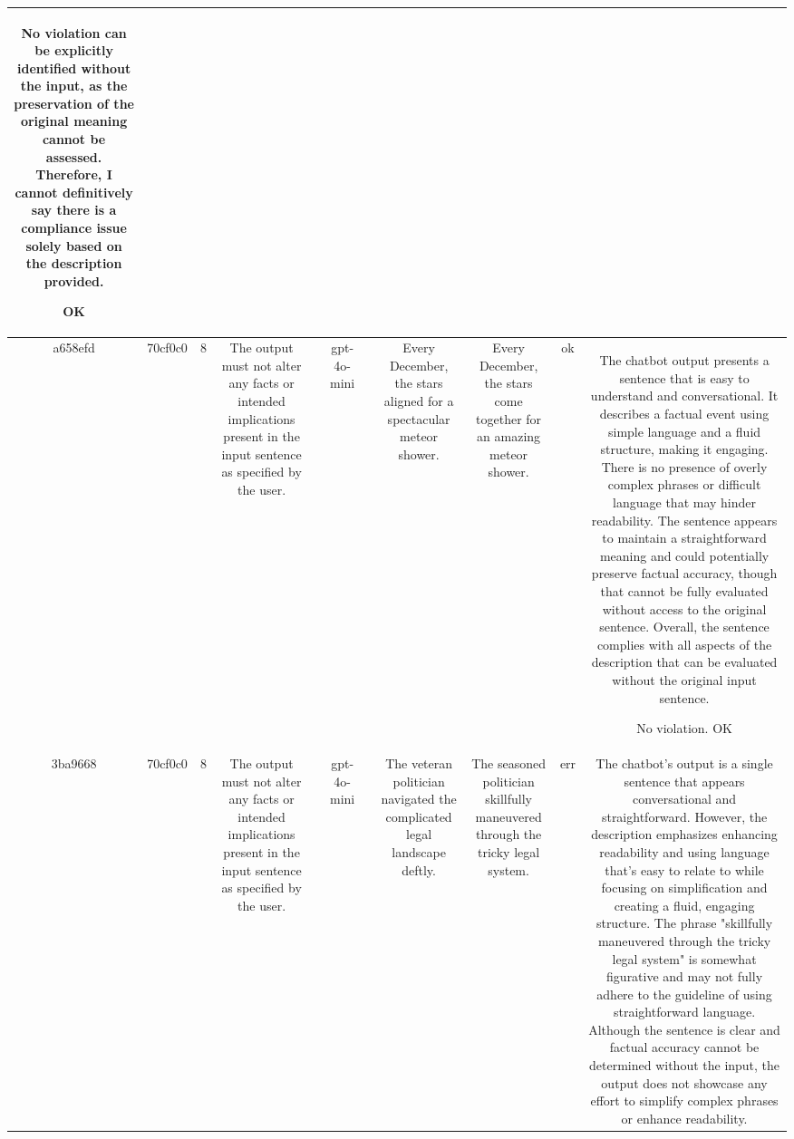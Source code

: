 \begin{table}[h!]
\begin{tabular}{|c|c|c|c|c|c|c|c|c|c|c|}
No violation can be explicitly identified without the input, as the preservation of the original meaning cannot be assessed. Therefore, I cannot definitively say there is a compliance issue solely based on the description provided.

OK\\
\hline
a658efd & 70cf0c0 & 8 & The output must not alter any facts or intended implications present in the input sentence as specified by the user. &  & gpt-4o-mini &  & Every December, the stars aligned for a spectacular meteor shower. & Every December, the stars come together for an amazing meteor shower. & ok & The chatbot output presents a sentence that is easy to understand and conversational. It describes a factual event using simple language and a fluid structure, making it engaging. There is no presence of overly complex phrases or difficult language that may hinder readability. The sentence appears to maintain a straightforward meaning and could potentially preserve factual accuracy, though that cannot be fully evaluated without access to the original sentence. Overall, the sentence complies with all aspects of the description that can be evaluated without the original input sentence.

No violation.
OK\\
\hline
3ba9668 & 70cf0c0 & 8 & The output must not alter any facts or intended implications present in the input sentence as specified by the user. &  & gpt-4o-mini &  & The veteran politician navigated the complicated legal landscape deftly. & The seasoned politician skillfully maneuvered through the tricky legal system. & err & The chatbot's output is a single sentence that appears conversational and straightforward. However, the description emphasizes enhancing readability and using language that's easy to relate to while focusing on simplification and creating a fluid, engaging structure. The phrase "skillfully maneuvered through the tricky legal system" is somewhat figurative and may not fully adhere to the guideline of using straightforward language. Although the sentence is clear and factual accuracy cannot be determined without the input, the output does not showcase any effort to simplify complex phrases or enhance readability.


\end{tabular}
\end{table}
